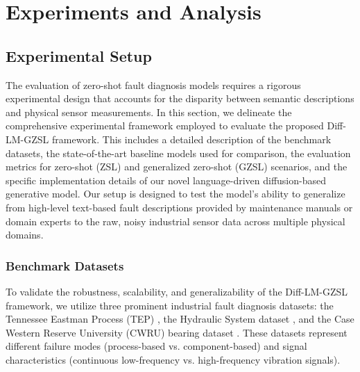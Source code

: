 \documentclass[journal]{IEEEtran}
\begin{document}
\section{Experiments and Analysis}
\subsection{Experimental Setup}
\label{sec:setup}
The evaluation of zero-shot fault diagnosis models requires a rigorous experimental design that accounts for the disparity between semantic descriptions and physical sensor measurements. In this section, we delineate the comprehensive experimental framework employed to evaluate the proposed Diff-LM-GZSL framework. This includes a detailed description of the benchmark datasets, the state-of-the-art baseline models used for comparison, the evaluation metrics for zero-shot (ZSL) and generalized zero-shot (GZSL) scenarios, and the specific implementation details of our novel language-driven diffusion-based generative model. Our setup is designed to test the model's ability to generalize from high-level text-based fault descriptions provided by maintenance manuals or domain experts to the raw, noisy industrial sensor data across multiple physical domains.

\subsubsection{Benchmark Datasets}
To validate the robustness, scalability, and generalizability of the Diff-LM-GZSL framework, we utilize three prominent industrial fault diagnosis datasets: the Tennessee Eastman Process (TEP) \cite{Downs1993TEP}, the Hydraulic System dataset \cite{Helwig2015hydraulic}, and the Case Western Reserve University (CWRU) bearing dataset \cite{Smith2015CWRU}. These datasets represent different failure modes (process-based vs. component-based) and signal characteristics (continuous low-frequency vs. high-frequency vibration signals).
\end{document}
